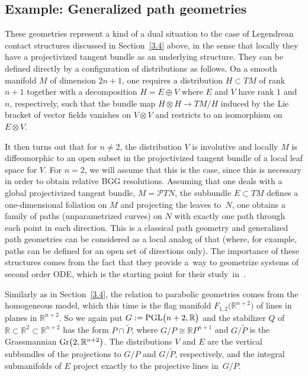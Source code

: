 \documentclass[pdftex]{sigma}
\numberwithin{equation}{section}
\def\Bbb{\mathbb}
\def\Cal{\mathcal}
\begin{document}
\subsection{Example: Generalized path geometries}\label{3.5}
These geometries represent a kind of a dual situation to the case of Legendrean
contact structures discussed in Section~\ref{3.4} above, in the sense that locally they
have a projectivized tangent bundle as an underlying structure. They can be defined
directly by a configuration of distributions as follows. On a smooth manifold $M$ of
dimension $2n+1$, one requires a distribution $H\subset TM$ of rank $n+1$ together
with a decomposition $H=E\oplus V$ where $E$ and $V$ have rank $1$ and $n$,
respectively, such that the bundle map $H\otimes H\to TM/H$ induced by the Lie
bracket of vector fields vanishes on $V\otimes V$ and restricts to an isomorphism on
$E\otimes V$.

It then turns out that for $n\neq 2$, the distribution $V$ is involutive and locally
$M$ is diffeomorphic to an open subset in the projectivized tangent bundle of a local
leaf space for $V$. For $n=2$, we will assume that this is the case, since this is
necessary in order to obtain relative BGG resolutions. Assuming that one deals with
a global projectivized tangent bundle, $M=\Cal PTN$, the subbundle $E\subset TM$
defines a one-dimensional foliation on $M$ and projecting the leaves to~$N$, one
obtains a family of paths (unparametrized curves) on $N$ with exactly one path
through each point in each direction. This is a classical path geometry and
generalized path geometries can be considered as a local analog of that (where, for
example, paths can be defined for an open set of directions only). The importance of
these structures comes from the fact that they provide a~way to geometrize systems of
second order ODE, which is the starting point for their study~in~\cite{Fels}.

Similarly as in Section~\ref{3.4}, the relation to parabolic geometries comes from the
homogeneous model, which this time is the flag manifold $F_{1,2}\bigl(\Bbb R^{n+2}\bigr)$ of
lines in planes in $\Bbb R^{n+2}$. So we again put $G:={\rm PGL}\bigl(n+2,\Bbb R\bigr)$ and the
stabilizer $Q$ of $\Bbb R\subset\Bbb R^2\subset\Bbb R^{n+2}$ has the form
$P\cap\tilde P$, where $G/P\cong\Bbb RP^{n+1}$ and $G/\tilde P$ is the Grassmannian
${\rm Gr}\bigl(2,\Bbb R^{n+2}\bigr)$. The distributions $V$ and $E$ are the vertical subbundles of
the projections to $G/P$ and $G/\tilde P$, respectively, and the integral
submanifolds of $E$ project exactly to the projective lines in~$G/P$.
\end{document}
